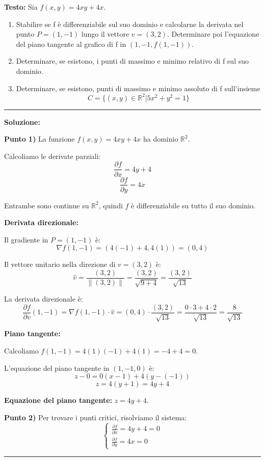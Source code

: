 \documentclass[12pt, a4paper]{article}
\newenvironment{solution}
{\par\noindent\rule{\textwidth}{0.4pt}\par\textbf{Soluzione:}\medskip\par}
{\par\rule{\textwidth}{0.4pt}\par\bigskip}
\begin{document}
\textbf{Testo:} Sia $f(x,y) = 4xy + 4x$.
\begin{enumerate}
    \item Stabilire se f è differenziabile sul suo dominio e calcolarne la derivata nel punto $P=(1,-1)$ lungo il vettore $v=(3,2)$. Determinare poi l'equazione del piano tangente al grafico di f in $(1,-1,f(1,-1))$.
    \item Determinare, se esistono, i punti di massimo e minimo relativo di f sul suo dominio.
    \item Determinare, se esistono, punti di massimo e minimo assoluto di f sull'insieme
    \[ C = \{(x,y) \in \mathbb{R}^{2} | 5x^{2}+y^{2}=1\} \]
\end{enumerate}

\begin{solution}
\textbf{Punto 1)} La funzione $f(x,y) = 4xy + 4x$ ha dominio $\mathbb{R}^2$.

Calcoliamo le derivate parziali:
\[
\frac{\partial f}{\partial x} = 4y + 4
\]
\[
\frac{\partial f}{\partial y} = 4x
\]

Entrambe sono continue su $\mathbb{R}^2$, quindi $f$ è differenziabile su tutto il suo dominio.

\textbf{Derivata direzionale:}

Il gradiente in $P = (1,-1)$ è:
\[
\nabla f(1,-1) = (4(-1) + 4, 4(1)) = (0, 4)
\]

Il vettore unitario nella direzione di $v = (3,2)$ è:
\[
\hat{v} = \frac{(3,2)}{\|(3,2)\|} = \frac{(3,2)}{\sqrt{9+4}} = \frac{(3,2)}{\sqrt{13}}
\]

La derivata direzionale è:
\[
\frac{\partial f}{\partial v}(1,-1) = \nabla f(1,-1) \cdot \hat{v} = (0,4) \cdot \frac{(3,2)}{\sqrt{13}} = \frac{0 \cdot 3 + 4 \cdot 2}{\sqrt{13}} = \frac{8}{\sqrt{13}}
\]

\textbf{Piano tangente:}

Calcoliamo $f(1,-1) = 4(1)(-1) + 4(1) = -4 + 4 = 0$.

L'equazione del piano tangente in $(1,-1,0)$ è:
\[
z - 0 = 0(x - 1) + 4(y - (-1))
\]
\[
z = 4(y + 1) = 4y + 4
\]

\textbf{Equazione del piano tangente:} $z = 4y + 4$.

\vspace{0.5cm}

\textbf{Punto 2)} Per trovare i punti critici, risolviamo il sistema:
\[
\begin{cases}
\frac{\partial f}{\partial x} = 4y + 4 = 0 \\
\frac{\partial f}{\partial y} = 4x = 0
\end{cases}
\]


\end{solution}
\end{document}
